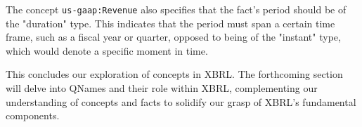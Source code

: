 The concept \texttt{us-gaap:Revenue} also specifies that the fact's period should be of the "duration" type.
This indicates that the period must span a certain time frame, such as a fiscal year or quarter,
opposed to being of the "instant" type, which would denote a specific moment in time.


This concludes our exploration of concepts in XBRL.
The forthcoming section will delve into QNames and their role within XBRL,
complementing our understanding of concepts and facts to solidify our grasp of XBRL's fundamental components.